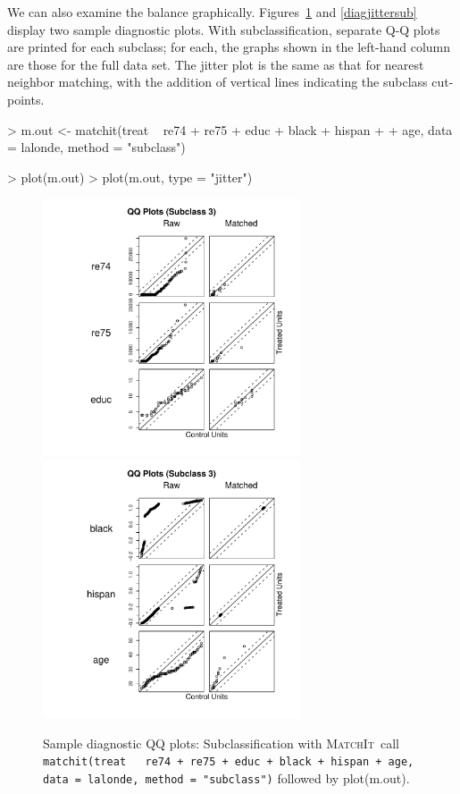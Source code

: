 \documentclass[oneside,letterpaper,titlepage]{article}
\newcommand{\MatchIt}{\textsc{MatchIt}}
\begin{document}
We can also examine the balance graphically.  Figures~\ref{diagqqsub}
and \ref{diagjittersub} display two sample diagnostic plots.  With
subclassification, separate Q-Q plots are printed for each subclass;
for each, the graphs shown in the left-hand column are those for the
full data set.  The jitter plot is the same as that for nearest
neighbor matching, with the addition of vertical lines indicating the
subclass cut-points.
\begin{Schunk}
\begin{Sinput}
> m.out <- matchit(treat ~ re74 + re75 + educ + black + hispan + 
+     age, data = lalonde, method = "subclass")
\end{Sinput}
\end{Schunk}
\begin{Schunk}
\begin{Sinput}
> plot(m.out)
> plot(m.out, type = "jitter")
\end{Sinput}
\end{Schunk}

\begin{figure}[tbp]
  \begin{center}
    \includegraphics[width=3in, height=3in]{figs/qqplotsub}
    \includegraphics[width=3in, height=3in]{figs/qqplotsub2}
    \hfill
    \caption{Sample diagnostic QQ plots: Subclassification with
      \MatchIt\ call \texttt{matchit(treat ~ re74 + re75 + educ +
        black + hispan + age, data = lalonde, method = "subclass")}
      followed by plot(m.out).}
    \label{diagqqsub}
  \end{center}
\end{figure}
\end{document}
